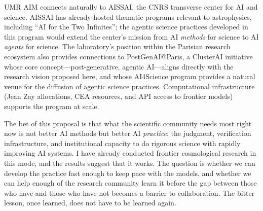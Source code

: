 \documentclass[11pt, a4paper]{article}
\begin{document}
UMR AIM connects naturally to AISSAI, the CNRS transverse center for AI and science.
AISSAI has already hosted thematic programs relevant to astrophysics, including ``AI for the Two Infinites''; the agentic science practices developed in this program would extend the center's mission from AI \emph{methods} for science to AI \emph{agents} for science.
The laboratory's position within the Parisian research ecosystem also provides connections to PostGenAI@Paris, a ClusterAI initiative whose core concept---post-generative, agentic AI---aligns directly with the research vision proposed here, and whose AI4Science program provides a natural venue for the diffusion of agentic science practices.
Computational infrastructure (Jean Zay allocations, CEA resources, and API access to frontier models) supports the program at scale.

\medskip
\noindent
The bet of this proposal is that what the scientific community needs most right now is not better AI methods but better AI \emph{practice}: the judgment, verification infrastructure, and institutional capacity to do rigorous science with rapidly improving AI systems.
I have already conducted frontier cosmological research in this mode, and the results suggest that it works.
The question is whether we can develop the practice fast enough to keep pace with the models, and whether we can help enough of the research community learn it before the gap between those who have and those who have not becomes a barrier to collaboration.
The bitter lesson, once learned, does not have to be learned again.



\end{document}
